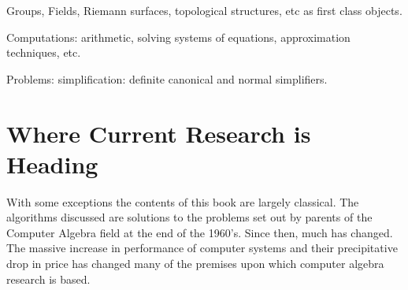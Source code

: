 Groups, Fields, Riemann surfaces, topological structures, etc as first
class objects.

Computations: arithmetic, solving systems of equations, approximation
techniques, etc.


Problems: simplification: definite canonical and normal simplifiers.




\section{Where Current Research is Heading}

With some exceptions the contents of this book are largely classical.
The algorithms discussed are solutions to the problems set out by
parents of the Computer Algebra field at the end of the 1960's.  Since
then, much has changed.  The massive increase in performance of computer
systems and their precipitative drop in price has changed many of the
premises upon which computer algebra research is based.

